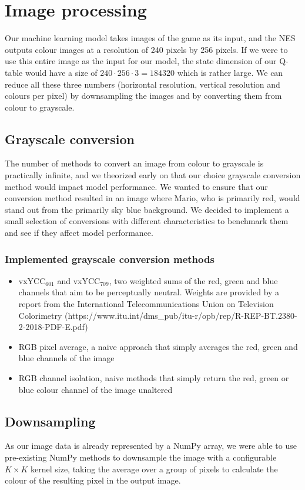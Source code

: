 \section{Image processing}

Our machine learning model takes images of the game as its input, and the NES outputs colour images at a resolution of 240 pixels by 256 pixels. If we were to use this entire image as the input for our model, the state dimension of our Q-table would have a size of $240 \cdot 256 \cdot 3 = 184320$ which is rather large. We can reduce all these three numbers (horizontal resolution, vertical resolution and colours per pixel) by downsampling the images and by converting them from colour to grayscale.

\subsection{Grayscale conversion}

The number of methods to convert an image from colour to grayscale is practically infinite, and we theorized early on that our choice grayscale conversion method would impact model performance. We wanted to ensure that our conversion method resulted in an image where Mario, who is primarily red, would stand out from the primarily sky blue background. We decided to implement a small selection of conversions with different characteristics to benchmark them and see if they affect model performance.

\subsubsection*{Implemented grayscale conversion methods}

\begin{itemize}
    \item vxYCC$_{601}$ and vxYCC$_{709}$, two weighted sums of the red, green and blue channels that aim to be perceptually neutral. Weights are provided by a report from the International Telecommunications Union on Television Colorimetry (https://www.itu.int/dms\_pub/itu-r/opb/rep/R-REP-BT.2380-2-2018-PDF-E.pdf)
    \item RGB pixel average, a naive approach that simply averages the red, green and blue channels of the image
    \item RGB channel isolation, naive methods that simply return the red, green or blue colour channel of the image unaltered
\end{itemize}

\subsection{Downsampling}

As our image data is already represented by a NumPy array, we were able to use pre-existing NumPy methods to downsample the image with a configurable $K \times K$ kernel size, taking the average over a group of pixels to calculate the colour of the resulting pixel in the output image.
